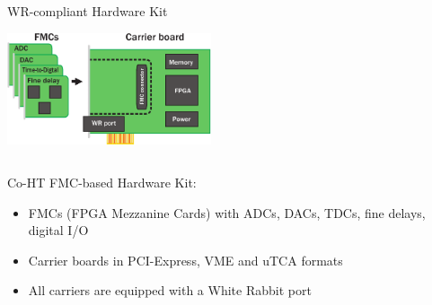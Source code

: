 \documentclass[compress,red]{beamer}
\begin{document}
\begin{frame}{WR-compliant Hardware Kit}

    \begin{center}
    \includegraphics[width=6cm]{node/shw_kit}
    \end{center}

  \begin{columns}[c]

	\begin{block}{Co-HT FMC-based Hardware Kit:}
	  \begin{itemize}
	  \item FMCs (FPGA Mezzanine Cards) with ADCs, DACs, TDCs, fine delays, digital I/O
	  \item Carrier boards in PCI-Express, VME and uTCA formats
	  \item All carriers are equipped with a White Rabbit port
	  \end{itemize}
	\end{block}

  \end{columns}


\end{frame}
\end{document}
